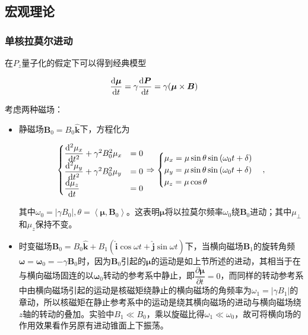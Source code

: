 \subsection{宏观理论}\label{ux5b8fux89c2ux7406ux8bba}

\subsubsection{单核拉莫尔进动}\label{ux5355ux6838ux62c9ux83abux5c14ux8fdbux52a8}

在\(P_z\)量子化的假定下可以得到经典模型

\begin{equation}
    \dfrac{{\rm d}\boldsymbol{\mu}}{{\rm d}t} = \gamma\dfrac{{\rm d}\boldsymbol{P}}{{\rm d}t} = \gamma (\boldsymbol{\mu}\times \boldsymbol{B})
\end{equation}

考虑两种磁场：

\begin{itemize}

\item
  静磁场\(\boldsymbol{B}_0 = B_0\hat{\boldsymbol{k}}\)下，方程化为

\begin{equation}
\begin{cases}
        \dfrac{{\rm d}^2\mu_x}{{\rm d}t^2} + \gamma^2B_0^2\mu_x & = 0\\
        \dfrac{{\rm d}^2\mu_y}{{\rm d}t^2} + \gamma^2B_0^2\mu_y & = 0\\
        \dfrac{{\rm d}\mu_z}{{\rm d}t} & = 0
    \end{cases}
    \Rightarrow
    \begin{cases}
        \mu_x = \mu \sin{\theta}\sin{\left(\omega_0 t + \delta\right)}\\
        \mu_y = \mu \sin{\theta}\sin{\left(\omega_0 t + \delta\right)}\\
        \mu_z = \mu \cos{\theta}
    \end{cases},
\end{equation}

​
其中\(\omega_0 = |\gamma B_0|, \theta = \left<\boldsymbol{\mu}, \boldsymbol{B}_0\right>\)。这表明\(\boldsymbol{\mu}\)将以拉莫尔频率\(\omega_0\)绕\(\boldsymbol{B}_0\)进动；其中\(\mu_{\perp}\)和\(\mu_z\)保持不变。

\item
  时变磁场\(\boldsymbol{B}_0 = B_0\hat{\boldsymbol{k}}+B_1(\hat{\boldsymbol{i}}\cos{\omega t} + \hat{\boldsymbol{j}}\sin{\omega t})\)下，当横向磁场\(\boldsymbol{B}_1\)的旋转角频\(\boldsymbol{\omega} = \boldsymbol{\omega}_0 = -\gamma \boldsymbol{B}_0\)时，因为\(\boldsymbol{B}_0\)引起的\(\boldsymbol{\mu}\)的运动是如上节所述的进动，其相当于在与横向磁场固连的以\(\boldsymbol{\omega}_0\)转动的参考系中静止，即\(\dfrac{\partial \boldsymbol{\mu}}{\partial t} = 0\)，而同样的转动参考系中由横向磁场引起的运动是核磁矩绕静止的横向磁场的角频率为\(\omega_1 = |\gamma B_1|\)的章动，所以核磁矩在静止参考系中的运动是绕其横向磁场的进动与横向磁场绕\(z\)轴的转动的叠加。实验中\(B_1\ll B_0\)，乘以旋磁比得\(\omega_1\ll \omega_0\)，故可将横向场的作用效果看作另原有进动锥面上下振荡。
\end{itemize}

